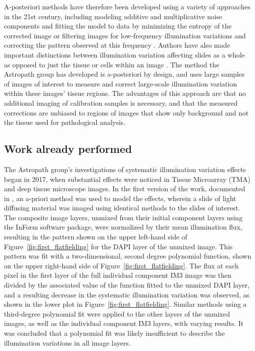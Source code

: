 \documentclass[letterpaper,11pt]{article}
\newcommand{\reffig}[1]{Figure~\ref{#1}}
\begin{document}
A-posteriori methods have therefore been developed using a variety of approaches in the 21st century, including modeling additive and multiplicative noise components and fitting the model to data by minimizing the entropy of the corrected image \cite{PMID:10692132} or filtering images for low-frequency illumination variations and correcting the pattern observed at this frequency \cite{Leong619}. Authors have also made important distinctions between illumination variation affecting slides as a whole as opposed to just the tissue or cells within an image \cite{Carpenter2006}. The method the Astropath group has developed is a-posteriori by design, and uses large samples of images of interest to measure and correct large-scale illumination variation within these images' tissue regions. The advantages of this approach are that no additional imaging of calibration samples is necessary, and that the measured corrections are unbiased to regions of images that show only background and not the tissue used for pathological analysis.

\subsection{Work already performed}
\label{ssec:work_already_performed}

The Astropath group's investigations of systematic illumination variation effects began in 2017, when substantial effects were noticed in Tissue Microarray (TMA) and deep tissue microscope images. In the first version of the work, documented in \cite{Alex_flatfielding_1}, an a-priori method was used to model the effects, wherein a slide of light diffusing material was imaged using identical methods to the slides of interest. The composite image layers, unmixed from their initial component layers using the InForm software package, were normalized by their mean illumination flux, resulting in the pattern shown on the upper left-hand side of \reffig{fig:first_flatfielding} for the DAPI layer of the unmixed image. This pattern was fit with a two-dimensional, second degree polynomial function, shown on the upper right-hand side of \reffig{fig:first_flatfielding}. The flux at each pixel in the first layer of the full individual component IM3 image was then divided by the associated value of the function fitted to the unmixed DAPI layer, and a resulting decrease in the systematic illumination variation was observed, as shown in the lower plot in \reffig{fig:first_flatfielding}. Similar methods using a third-degree polynomial fit were applied to the other layers of the unmixed images, as well as the individual component IM3 layers, with varying results. It was concluded that a polynomial fit was likely insufficient to describe the illumination variations in all image layers.
\end{document}
